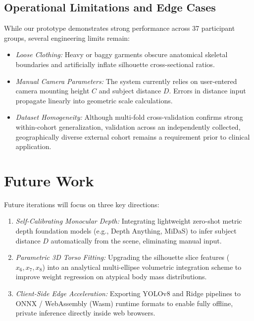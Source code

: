 \documentclass[conference]{IEEEtran}
\begin{document}
\subsection{Operational Limitations and Edge Cases}
While our prototype demonstrates strong performance across 37 participant groups, several engineering limits remain:
\begin{itemize}
    \item \textit{Loose Clothing:} Heavy or baggy garments obscure anatomical skeletal boundaries and artificially inflate silhouette cross-sectional ratios.
    \item \textit{Manual Camera Parameters:} The system currently relies on user-entered camera mounting height $C$ and subject distance $D$. Errors in distance input propagate linearly into geometric scale calculations.
    \item \textit{Dataset Homogeneity:} Although multi-fold cross-validation confirms strong within-cohort generalization, validation across an independently collected, geographically diverse external cohort remains a requirement prior to clinical application.
\end{itemize}

\section{Future Work}
Future iterations will focus on three key directions:
\begin{enumerate}
    \item \textit{Self-Calibrating Monocular Depth:} Integrating lightweight zero-shot metric depth foundation models (e.g., Depth Anything, MiDaS) to infer subject distance $D$ automatically from the scene, eliminating manual input.
    \item \textit{Parametric 3D Torso Fitting:} Upgrading the silhouette slice features ($x_6, x_7, x_8$) into an analytical multi-ellipse volumetric integration scheme to improve weight regression on atypical body mass distributions.
    \item \textit{Client-Side Edge Acceleration:} Exporting YOLOv8 and Ridge pipelines to ONNX / WebAssembly (Wasm) runtime formats to enable fully offline, private inference directly inside web browsers.
\end{enumerate}
\end{document}
